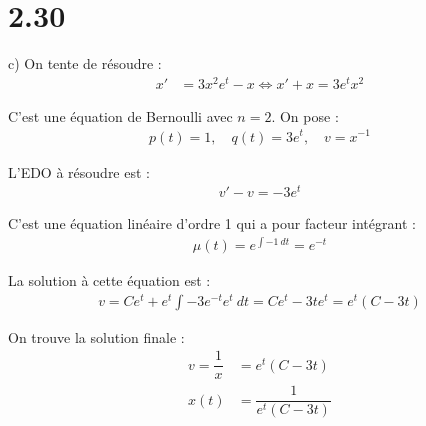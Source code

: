 \section*{2.30}

c) On tente de résoudre :
\begin{align*}
    x' &= 3x^2 e^t - x \iff x' + x =3e^t x^2
\end{align*}

C'est une équation de Bernoulli avec $n = 2$. On pose :
\begin{align*}
    p(t) = 1,\quad q(t) = 3e^t,\quad v = x^{-1}
\end{align*}

L'EDO à résoudre est :
\begin{align*}
    v' - v = -3e^t
\end{align*}

C'est une équation linéaire d'ordre 1 qui a pour facteur intégrant :
\begin{align*}
    \mu(t) = e^{\int{-1\ dt}} = e^{-t}
\end{align*}

La solution à cette équation est :
\begin{align*}
    v = Ce^t + e^t\int{-3e^{-t}e^t\ dt} = Ce^t -3te^t = e^t(C - 3t)
\end{align*}

On trouve la solution finale :
\begin{align*}
    v = \dfrac{1}{x} &= e^t(C - 3t) \\
    x(t) &= \dfrac{1}{e^t(C-3t)}
\end{align*}
